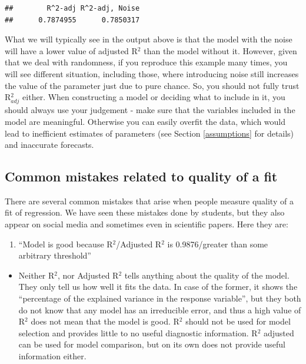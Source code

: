 \documentclass[
]{book}
\providecommand{\tightlist}{%
  \setlength{\itemsep}{0pt}\setlength{\parskip}{0pt}}
\theoremstyle{definition}
\theoremstyle{definition}
\theoremstyle{definition}
\theoremstyle{definition}
\theoremstyle{remark}
\begin{document}
\begin{verbatim}
##        R^2-adj R^2-adj, Noise 
##      0.7874955      0.7850317
\end{verbatim}

What we will typically see in the output above is that the model with the noise will have a lower value of adjusted R\(^2\) than the model without it. However, given that we deal with randomness, if you reproduce this example many times, you will see different situation, including those, where introducing noise still increases the value of the parameter just due to pure chance. So, you should not fully trust R\(^2_{adj}\) either. When constructing a model or deciding what to include in it, you should always use your judgement - make sure that the variables included in the model are meaningful. Otherwise you can easily overfit the data, which would lead to inefficient estimates of parameters (see Section \ref{assumptions} for details) and inaccurate forecasts.

\subsection{Common mistakes related to quality of a fit}\label{common-mistakes-related-to-quality-of-a-fit}

There are several common mistakes that arise when people measure quality of a fit of regression. We have seen these mistakes done by students, but they also appear on social media and sometimes even in scientific papers. Here they are:

\begin{enumerate}
\def\labelenumi{\arabic{enumi}.}
\tightlist
\item
  ``Model is good because R\(^2\)/Adjusted R\(^2\) is 0.9876/greater than some arbitrary threshold''
\end{enumerate}

\begin{itemize}
\tightlist
\item
  Neither R\(^2\), nor Adjusted R\(^2\) tells anything about the quality of the model. They only tell us how well it fits the data. In case of the former, it shows the ``percentage of the explained variance in the response variable'', but they both do not know that any model has an irreducible error, and thus a high value of R\(^2\) does not mean that the model is good. R\(^2\) should not be used for model selection and provides little to no useful diagnostic information. R\(^2\) adjusted can be used for model comparison, but on its own does not provide useful information either.
\end{itemize}
\end{document}
